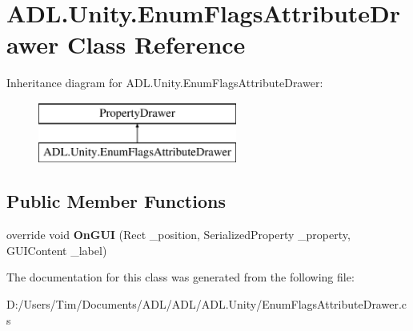 \hypertarget{class_a_d_l_1_1_unity_1_1_enum_flags_attribute_drawer}{}\section{A\+D\+L.\+Unity.\+Enum\+Flags\+Attribute\+Drawer Class Reference}
\label{class_a_d_l_1_1_unity_1_1_enum_flags_attribute_drawer}
Inheritance diagram for A\+D\+L.\+Unity.\+Enum\+Flags\+Attribute\+Drawer\+:\begin{figure}[H]
\begin{center}
\leavevmode
\includegraphics[height=2.000000cm]{class_a_d_l_1_1_unity_1_1_enum_flags_attribute_drawer}
\end{center}
\end{figure}
\subsection*{Public Member Functions}
\begin{DoxyCompactItemize}
\item 
\mbox{\label{class_a_d_l_1_1_unity_1_1_enum_flags_attribute_drawer_a4b117e80308b1e6e61eae375c4bd18f1}} 
override void {\bfseries On\+G\+UI} (Rect \+\_\+position, Serialized\+Property \+\_\+property, G\+U\+I\+Content \+\_\+label)
\end{DoxyCompactItemize}


The documentation for this class was generated from the following file\+:\begin{DoxyCompactItemize}
\item 
D\+:/\+Users/\+Tim/\+Documents/\+A\+D\+L/\+A\+D\+L/\+A\+D\+L.\+Unity/Enum\+Flags\+Attribute\+Drawer.\+cs\end{DoxyCompactItemize}
